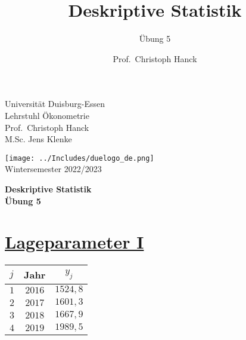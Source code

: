 \documentclass[12pt,a4paper]{article}
\title{Deskriptive Statistik}
\subtitle{Übung 5}
\author{Prof.~Christoph Hanck}
\date{}
\newcommand{\tmpsection}[1]{}
\let\tmpsection=\section
\renewcommand{\section}[1]{\tmpsection{\underline{#1}} }
\begin{document}





\restoregeometry



\begin{minipage}{0.6\textwidth}
Universität Duisburg-Essen\\
Lehrstuhl Ökonometrie\\
Prof.~Christoph Hanck \\
M.Sc. Jens Klenke \\
\end{minipage}

	\begin{flushright}
	\vspace{-3.55cm}
	\texttt{[image: ../Includes/duelogo\_de.png]}\\
	\vspace{.125cm}
	Wintersemester 2022/2023
	\end{flushright}


\begin{center}
	\vspace{.25cm}
	\textbf{\Large{Deskriptive Statistik}}\\
	\vspace{.25cm}
	\textbf{\large{Übung 5}}\\
	\vspace{.125cm}
\end{center}





\hypertarget{lageparameter-i}{%
\section{Lageparameter I}\label{lageparameter-i}}

\begin{center}
  \begin{tabular}{lcc}
    $j$ & Jahr & $y_j$ \\
    \toprule
    $1$ & $2016$ & $1524,8$ \\
    $2$ & $2017$ & $1601,3$ \\
    $3$ & $2018$ & $1667,9$ \\
    $4$ & $2019$ & $1989,5$ \\
  \end{tabular}
\end{center}
\end{document}
